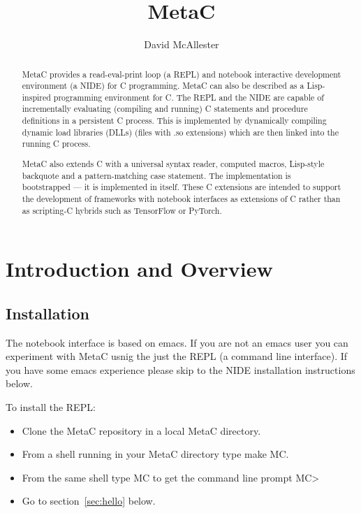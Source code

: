 \documentclass{article}
\title{MetaC}
\author{David McAllester}
\begin{document}
\maketitle

\begin{abstract}
  MetaC provides a read-eval-print loop (a REPL) and notebook interactive development environment (a NIDE) for C programming.
  MetaC can also be described as a Lisp-inspired programming environment for C.
  The REPL and the NIDE  are capable of incrementally evaluating (compiling and running)
  C statements and procedure definitions in a persistent C process.  This is implemented by dynamically compiling dynamic load libraries (DLLs)
  (files with .so extensions) which are then linked into the running C process.

  MetaC also extends C with a universal syntax reader, computed macros, Lisp-style backquote and a pattern-matching case statement.
  The implementation is bootstrapped --- it is implemented in itself.  These C extensions are intended to support the development of frameworks
  with notebook interfaces as extensions of C rather than as scripting-C hybrids such as TensorFlow or PyTorch.
\end{abstract}

\newpage

\tableofcontents

\newpage

\section{Introduction and Overview}

\subsection{Installation}

The notebook interface is based on emacs.  If you are not an emacs user you can experiment with MetaC usnig the just the REPL
(a command line interface).  If you have some emacs experience please skip to the NIDE installation instructions below.

To install the REPL:
\begin{itemize}
\item Clone the MetaC repository in a local MetaC directory.
\item From a shell running in your MetaC directory type make MC.
\item From the same shell type MC to get the command line prompt MC>
\item Go to section~\ref{sec:hello} below.
\end{itemize}
\end{document}
